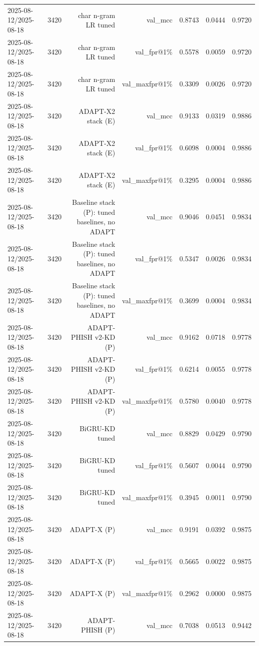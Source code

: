 \begin{table}[t]
\begin{tabular}{llrrrrr}
2025-08-12/2025-08-18 & 3420 & char n-gram LR tuned & val\_mcc & 0.8743 & 0.0444 & 0.9720 \\
2025-08-12/2025-08-18 & 3420 & char n-gram LR tuned & val\_fpr@1\% & 0.5578 & 0.0059 & 0.9720 \\
2025-08-12/2025-08-18 & 3420 & char n-gram LR tuned & val\_maxfpr@1\% & 0.3309 & 0.0026 & 0.9720 \\
2025-08-12/2025-08-18 & 3420 & ADAPT-X2 stack (E) & val\_mcc & 0.9133 & 0.0319 & 0.9886 \\
2025-08-12/2025-08-18 & 3420 & ADAPT-X2 stack (E) & val\_fpr@1\% & 0.6098 & 0.0004 & 0.9886 \\
2025-08-12/2025-08-18 & 3420 & ADAPT-X2 stack (E) & val\_maxfpr@1\% & 0.3295 & 0.0004 & 0.9886 \\
2025-08-12/2025-08-18 & 3420 & Baseline stack (P): tuned baselines, no ADAPT & val\_mcc & 0.9046 & 0.0451 & 0.9834 \\
2025-08-12/2025-08-18 & 3420 & Baseline stack (P): tuned baselines, no ADAPT & val\_fpr@1\% & 0.5347 & 0.0026 & 0.9834 \\
2025-08-12/2025-08-18 & 3420 & Baseline stack (P): tuned baselines, no ADAPT & val\_maxfpr@1\% & 0.3699 & 0.0004 & 0.9834 \\
2025-08-12/2025-08-18 & 3420 & ADAPT-PHISH v2-KD (P) & val\_mcc & 0.9162 & 0.0718 & 0.9778 \\
2025-08-12/2025-08-18 & 3420 & ADAPT-PHISH v2-KD (P) & val\_fpr@1\% & 0.6214 & 0.0055 & 0.9778 \\
2025-08-12/2025-08-18 & 3420 & ADAPT-PHISH v2-KD (P) & val\_maxfpr@1\% & 0.5780 & 0.0040 & 0.9778 \\
2025-08-12/2025-08-18 & 3420 & BiGRU-KD tuned & val\_mcc & 0.8829 & 0.0429 & 0.9790 \\
2025-08-12/2025-08-18 & 3420 & BiGRU-KD tuned & val\_fpr@1\% & 0.5607 & 0.0044 & 0.9790 \\
2025-08-12/2025-08-18 & 3420 & BiGRU-KD tuned & val\_maxfpr@1\% & 0.3945 & 0.0011 & 0.9790 \\
2025-08-12/2025-08-18 & 3420 & ADAPT-X (P) & val\_mcc & 0.9191 & 0.0392 & 0.9875 \\
2025-08-12/2025-08-18 & 3420 & ADAPT-X (P) & val\_fpr@1\% & 0.5665 & 0.0022 & 0.9875 \\
2025-08-12/2025-08-18 & 3420 & ADAPT-X (P) & val\_maxfpr@1\% & 0.2962 & 0.0000 & 0.9875 \\
2025-08-12/2025-08-18 & 3420 & ADAPT-PHISH (P) & val\_mcc & 0.7038 & 0.0513 & 0.9442 \\

\end{tabular}
\end{table}
